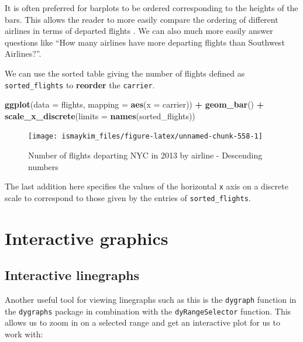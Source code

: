 \documentclass[12pt, krantz2,]{krantz}
\makeatletter
\newenvironment{Shaded}{\begin{snugshade}}{\end{snugshade}}
\newcommand{\DataTypeTok}[1]{\textcolor[rgb]{0.27,0.27,0.27}{#1}}
\newcommand{\KeywordTok}[1]{\textcolor[rgb]{0.27,0.27,0.27}{\textbf{#1}}}
\newcommand{\NormalTok}[1]{#1}
\newcommand{\OperatorTok}[1]{\textcolor[rgb]{0.43,0.43,0.43}{\textbf{#1}}}
\newcommand{\StringTok}[1]{\textcolor[rgb]{0.5,0.5,0.5}{#1}}
\newenvironment{kframe}{%
\medskip{}
\setlength{\fboxsep}{.8em}
 \def\at@end@of@kframe{}%
 \ifinner\ifhmode%
  \def\at@end@of@kframe{\end{minipage}}%
  \begin{minipage}{\columnwidth}%
 \fi\fi%
 \def\FrameCommand##1{\hskip\@totalleftmargin \hskip-\fboxsep
 \colorbox{shadecolor}{##1}\hskip-\fboxsep
     \hskip-\linewidth \hskip-\@totalleftmargin \hskip\columnwidth}%
 \MakeFramed {\advance\hsize-\width
   \@totalleftmargin\z@ \linewidth\hsize
   \@setminipage}}%
 {\par\unskip\endMakeFramed%
 \at@end@of@kframe}
\renewenvironment{Shaded}{\begin{kframe}}{\end{kframe}}
\makeatother
\begin{document}
It is often preferred for barplots to be ordered corresponding to the heights of the bars. This allows the reader to more easily compare the ordering of different airlines in terms of departed flights \citep{robbins2013}. We can also much more easily answer questions like ``How many airlines have more departing flights than Southwest Airlines?''.

We can use the sorted table giving the number of flights defined as \texttt{sorted\_flights} to \textbf{reorder} the \texttt{carrier}.

\begin{Shaded}
\begin{Highlighting}[]
\KeywordTok{ggplot}\NormalTok{(}\DataTypeTok{data =}\NormalTok{ flights, }\DataTypeTok{mapping =} \KeywordTok{aes}\NormalTok{(}\DataTypeTok{x =}\NormalTok{ carrier)) }\OperatorTok{+}
\StringTok{  }\KeywordTok{geom_bar}\NormalTok{() }\OperatorTok{+}
\StringTok{  }\KeywordTok{scale_x_discrete}\NormalTok{(}\DataTypeTok{limits =} \KeywordTok{names}\NormalTok{(sorted_flights))}
\end{Highlighting}
\end{Shaded}

\begin{figure}

{\centering \texttt{[image: ismaykim\_files/figure-latex/unnamed-chunk-558-1]} 

}

\caption{Number of flights departing NYC in 2013 by airline - Descending numbers}\label{fig:unnamed-chunk-558}
\end{figure}

The last addition here specifies the values of the horizontal \texttt{x} axis on a discrete scale to correspond to those given by the entries of \texttt{sorted\_flights}.

\hypertarget{interactive-graphics}{%
\section{Interactive graphics}\label{interactive-graphics}}

\hypertarget{interactive-linegraphs}{%
\subsection{Interactive linegraphs}\label{interactive-linegraphs}}

Another useful tool for viewing linegraphs such as this is the \texttt{dygraph} function in the \texttt{dygraphs} package in combination with the \texttt{dyRangeSelector} function. This allows us to zoom in on a selected range and get an interactive plot for us to work with:
\end{document}
